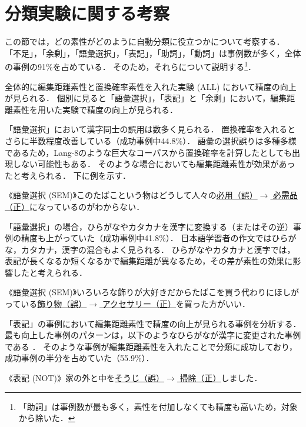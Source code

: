 \documentclass[japanese]{jnlp_1.4}
\renewenvironment{quote}{}{}
\begin{document}
\section{分類実験に関する考察}

この節では，どの素性がどのように自動分類に役立つかについて考察する．
「不足」，「余剰」，「語彙選択」，「表記」，「助詞」，「動詞」は事例数が多く，全体の事例の91\%を占めている．
そのため，それらについて説明する\footnote{「助詞」は事例数が最も多く，素性を付加しなくても精度も高いため，対象から除いた．}．

全体的に編集距離素性と置換確率素性を入れた実験 (ALL) において精度の向上が見られる．
個別に見ると「語彙選択」，「表記」と「余剰」において，編集距離素性を用いた実験で精度の向上が見られる．

「語彙選択」において漢字同士の誤用は数多く見られる．
置換確率を入れるとさらに半数程度改善している（成功事例中44.8\%）．
語彙の選択誤りは多種多様であるため，Lang-8のような巨大なコーパスから置換確率を計算したとしても出現しない可能性もある．
そのような場合においても編集距離素性が効果があったと考えられる．
下に例を示す．

\begin{quote}
《語彙選択 (SEM)》このたばこという物はどうして人々の\underline{必用（誤）$\rightarrow$ 必需品（正）}になっているのがわからない．
\end{quote}

「語彙選択」の場合，ひらがなやカタカナを漢字に変換する（またはその逆）事例の精度も上がっていた（成功事例中41.8\%）．
日本語学習者の作文ではひらがな，カタカナ，漢字の混合もよく見られる．
ひらがなやカタカナと漢字では，表記が長くなるか短くなるかで編集距離が異なるため，その差が素性の効果に影響したと考えられる．

\begin{quote}
《語彙選択 (SEM)》いろいろな飾りが大好きだからたばこを買う代わりにほしがっている\underline{飾り物（誤）$\rightarrow$ アクセサリー（正）}を買った方がいい．
\end{quote}

「表記」の事例において編集距離素性で精度の向上が見られる事例を分析する．
最も向上した事例のパターンは，以下のようなひらがなが漢字に変更された事例である ．
そのような事例が編集距離素性を入れたことで分類に成功しており，成功事例の半分を占めていた（55.9\%）．

\begin{quote}
《表記 (NOT)》家の外と中を\underline{そうじ（誤）$\rightarrow$ 掃除（正）}しました．
\end{quote}
\end{document}
